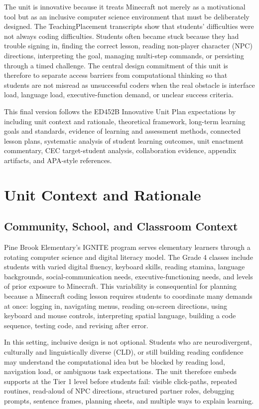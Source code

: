\documentclass[12pt]{article}
\begin{document}
The unit is innovative because it treats Minecraft not merely as a motivational tool but as an inclusive computer science environment that must be deliberately designed. The TeachingPlacement transcripts show that students' difficulties were not always coding difficulties. Students often became stuck because they had trouble signing in, finding the correct lesson, reading non-player character (NPC) directions, interpreting the goal, managing multi-step commands, or persisting through a timed challenge. The central design commitment of this unit is therefore to separate access barriers from computational thinking so that students are not misread as unsuccessful coders when the real obstacle is interface load, language load, executive-function demand, or unclear success criteria.

This final version follows the ED452B Innovative Unit Plan expectations by including unit context and rationale, theoretical framework, long-term learning goals and standards, evidence of learning and assessment methods, connected lesson plans, systematic analysis of student learning outcomes, unit enactment commentary, CEC target-student analysis, collaboration evidence, appendix artifacts, and APA-style references.

\section{Unit Context and Rationale}
\subsection{Community, School, and Classroom Context}
Pine Brook Elementary's IGNITE program serves elementary learners through a rotating computer science and digital literacy model. The Grade 4 classes include students with varied digital fluency, keyboard skills, reading stamina, language backgrounds, social-communication needs, executive-functioning needs, and levels of prior exposure to Minecraft. This variability is consequential for planning because a Minecraft coding lesson requires students to coordinate many demands at once: logging in, navigating menus, reading on-screen directions, using keyboard and mouse controls, interpreting spatial language, building a code sequence, testing code, and revising after error.

In this setting, inclusive design is not optional. Students who are neurodivergent, culturally and linguistically diverse (CLD), or still building reading confidence may understand the computational idea but be blocked by reading load, navigation load, or ambiguous task expectations. The unit therefore embeds supports at the Tier 1 level before students fail: visible click-paths, repeated routines, read-aloud of NPC directions, structured partner roles, debugging prompts, sentence frames, planning sheets, and multiple ways to explain learning.
\end{document}
